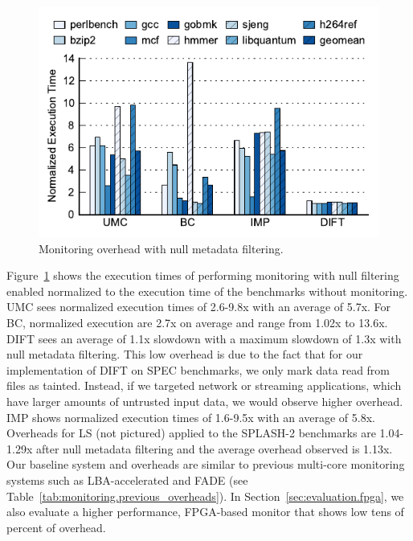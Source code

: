 \begin{figure}
  \begin{center}
    \includegraphics[width=\columnwidth]{figs/data_filtering.pdf}
    \vspace{-0.2in}
    \caption{Monitoring overhead with null metadata filtering.}
    \label{fig:evaluation.filtering}
    \vspace{-0.1in}
  \end{center}
\end{figure}

Figure~\ref{fig:evaluation.filtering} shows the
execution times of performing monitoring with null filtering enabled normalized
to the execution time of the benchmarks without monitoring. UMC sees normalized
execution times of 2.6-9.8x with an average of 5.7x.
For BC, normalized execution
are 2.7x on average and range from 1.02x to 13.6x.
DIFT sees an average of 1.1x slowdown with a maximum slowdown of 1.3x with null
metadata filtering. This low overhead is due to the fact
that for our implementation of DIFT on SPEC
benchmarks, we only mark data read from files as tainted. Instead, if we
targeted network or streaming applications, which have larger amounts of
untrusted input data, we would observe higher overhead. IMP shows normalized
execution times of 1.6-9.5x with an average of 5.8x. Overheads for LS (not pictured)
applied to the SPLASH-2 benchmarks are
1.04-1.29x after null metadata filtering and the average
overhead observed is 1.13x.
Our baseline system and overheads are similar to previous multi-core
monitoring systems such as LBA-accelerated \cite{lba-isca08} and FADE
\cite{fade-hpca14} (see
Table~\ref{tab:monitoring.previous_overheads}). In
Section~\ref{sec:evaluation.fpga}, we also evaluate a higher performance, FPGA-based
monitor that shows low tens of percent of overhead. 

